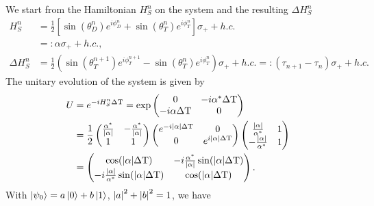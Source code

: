 We start from the Hamiltonian $H_S^n$ on the system and the resulting $\Delta H^n_S$
\begin{align}
	H_S^n &= \frac{1}{2} \left[\sin(\theta_D^n) e^{i\phi_D^n} + \sin(\theta_T^n) e^{i\phi_T^n}\right] \sigma_{+} + h.c. \nonumber \\
	& =: \alpha \sigma_{+} + h.c., \nonumber \\
	\Delta H_S^n & = \frac{1}{2}(\sin(\theta_T^{n+1})e^{i\phi_T^{n+1}} - \sin(\theta_T^n)e^{i\phi_T^n}) \sigma_{+} + h.c. =: (\tau_{n+1} - \tau_n) \sigma_{+} + h.c. \nonumber
\end{align}
The unitary evolution of the system is given by
\begin{align}
	U & = e^{-iH_S^n \Delta \mathrm{T}} = 
	\exp \begin{pmatrix}
	0 & -i\alpha^* \Delta \mathrm{T} \\
	-i \alpha \Delta \mathrm{T} & 0 \\
	\end{pmatrix} \nonumber \\
	& = 
	\frac{1}{2} \begin{pmatrix}
	\frac{\alpha^*}{\abs{\alpha}} & -\frac{\alpha^*}{\abs{\alpha}} \\
	1 & 1 \\
	\end{pmatrix}
	\begin{pmatrix}
	e^{-i\abs{\alpha} \Delta \mathrm{T}} & 0 \\
	0 & e^{i\abs{\alpha} \Delta \mathrm{T}} \\
	\end{pmatrix}
	\begin{pmatrix}
	\frac{\abs{\alpha}}{\alpha^*} & 1 \\
	-\frac{\abs{\alpha}}{\alpha^*} & 1 \\
	\end{pmatrix} \nonumber \\
	& = \begin{pmatrix}
	\cos(\abs{\alpha}\Delta \mathrm{T}) & -i\frac{\alpha^*}{\abs{\alpha}} \sin(\abs{\alpha}\Delta \mathrm{T}) \\
	-i\frac{\abs{\alpha}}{\alpha^*} \sin(\abs{\alpha}\Delta \mathrm{T}) & \cos(\abs{\alpha} \Delta \mathrm{T}) \\
	\end{pmatrix}. \nonumber
\end{align}
With $\ket{\psi_0} = a \ket{0} + b \ket{1}$,  $\abs{a}^2 + \abs{b}^2 = 1$, we  have
